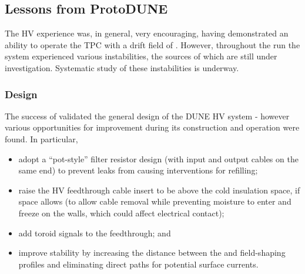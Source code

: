 
\subsection{Lessons from ProtoDUNE}

\label{sec:fdsp-hv-protodune-lessons}
The  HV experience was, in general, very encouraging, having demonstrated 
an ability to operate the TPC with a drift field of \spmaxfield{}. %
However, throughout the run the system experienced various instabilities, the sources of which are %
still under investigation.
Systematic study of these instabilities is underway.

\subsubsection{Design}
\label{sec:fdsp-hv-protodune-lessons-design}

The success of  validated the general design of the DUNE HV system - however various opportunities for improvement during its construction and operation were found. In particular,

\begin{itemize}
\item adopt a ``pot-style'' filter resistor design (with input and output cables on the same end) %
to prevent leaks from causing interventions for refilling;
\item raise the HV feedthrough cable insert to be above the cold insulation space, if space allows (to allow cable removal while preventing moisture to enter and freeze on the walls, which could affect electrical contact);
\item add toroid signals %
to the feedthrough; and
\item improve stability by increasing the distance between the  and field-shaping profiles and eliminating direct paths for potential surface currents.
\end{itemize}

